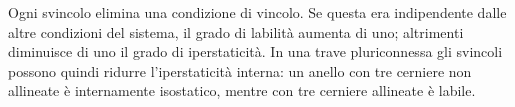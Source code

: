 \begin{oss}
	Ogni svincolo elimina una condizione di vincolo. Se
	questa era indipendente dalle altre condizioni del
	sistema, il grado di labilità aumenta di uno;
	altrimenti diminuisce di uno il grado di iperstaticità.
	In una trave pluriconnessa gli svincoli possono quindi
	ridurre l'iperstaticità interna: un anello con tre
	cerniere non allineate è internamente isostatico,
	mentre con tre cerniere allineate è labile.
\end{oss}
